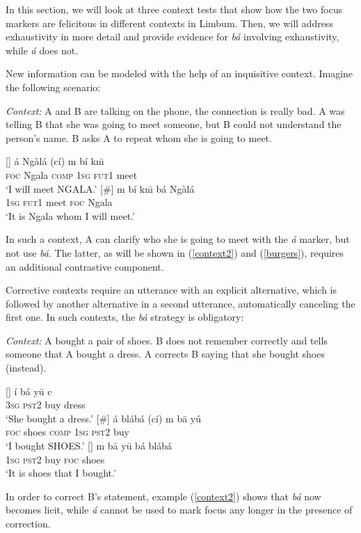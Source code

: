 \documentclass[output=paper,
modfonts
]{langscibook}
\begin{document}
\noindent
In this section, we will look at three context tests that show how the two focus markers are felicitous in different contexts in Limbum. Then, we will address exhaustivity in more detail and provide evidence for \textit{bá} involving exhaustivity, while \textit{á} does not.

New information can be modeled with the help of an inquisitive context. Imagine the following scenario:

\begin{exe}
\ex
\textit{Context:} A and B are talking on the phone, the connection is really bad. A was telling B that she was going to meet someone, but B could not understand the person's name. B asks A to repeat whom she is going to meet.\label{context1}
\begin{xlist}
[]{
\gll á Ngàlá  (cí) m bí kn\={\i} \\
\textsc{foc} Ngala \textsc{comp} \textsc{1sg} \textsc{fut1} meet \\
\glt `I will meet NGALA.'}
[\#]{
\gll m bí kn\={\i} bá Ngàlá\\
\textsc{1sg} \textsc{fut1} meet \textsc{foc} Ngala \\
\glt `It is Ngala whom I will meet.'}
\end{xlist}
\end{exe}

\noindent 
In such a context, A can clarify who she is going to meet with the \textit{á} marker, but not use \textit{bá}. The latter, as will be shown in (\ref{context2}) and (\ref{burgers}), requires an additional contrastive component.

Corrective contexts require an utterance with an explicit alternative, which is followed by another alternative in a second utterance, automatically canceling the first one. In such contexts, the \textit{bá} strategy is obligatory:

\begin{exe}
\ex
\textit{Context:} A bought a pair of shoes. B does not remember correctly and tells someone that A bought a dress. A corrects B saying that she bought shoes (instead). 
\label{context2}
\begin{xlist}
[] {
\gll \'i b\'a y\=u c\\
 	\textsc{3sg} \textsc{pst2} buy dress\\
\glt `She bought a dress.'\label{7B}}
[\#] {
\gll \'a bl\'ab\'a (c\'i) m b\=a y\'u \\
\textsc{foc} shoes \textsc{comp} \textsc{1sg} \textsc{pst2} buy\\
\glt `I bought SHOES.'}
[] {
\gll m b\=a y\=u b\'a bl\'ab\'a\\
\textsc{1sg} \textsc{pst2} buy  \textsc{foc} shoes\\
\glt `It is shoes that I bought.' }
\end{xlist}
\end{exe}
In order to correct B's statement, example (\ref{context2}) shows that \textit{bá} now becomes licit, while \textit{á} cannot be used to mark focus any longer in the presence of correction.
\end{document}
